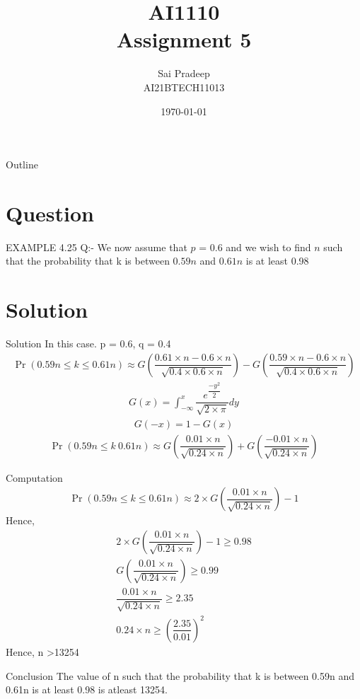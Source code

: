 \documentclass{beamer}
\title{AI1110 \\ Assignment 5}
\author{Sai Pradeep \\ AI21BTECH11013}
\date{\today}
\providecommand{\pr}[1]{\ensuremath{\Pr\left(#1\right)}}
\begin{document}
	\begin{frame}
		\titlepage
	\end{frame}
	\begin{frame}{Outline}
		\tableofcontents
	\end{frame}
	
	\section{Question}
	\begin{frame}{EXAMPLE 4.25}
Q:-	 We now assume that $p$ = 0.6 and we wish to find $n$ such that the probability that k
   is between $0.59n$ and $0.61n$ is at least 0.98\\
   \end{frame}
	
	\section{Solution}
	\begin{frame}{Solution}
In this case. p = 0.6, q = 0.4 \\
\begin{align}
\pr{0.59n \leq k \leq 0.61n} \approx G(\dfrac{0.61 \times n- 0.6 \times n}{\sqrt{0.4\times 0.6 \times n}})-G(\dfrac{0.59 \times n- 0.6 \times n}{\sqrt{0.4\times 0.6 \times n}})
\end{align}
\begin{align}
G(x) = \int_{-\infty}^x \dfrac{e^{\dfrac{-y^2}{2}}}{\sqrt{2 \times \pi }}dy
\end{align}
\begin{align}
G(-x)=1-G(x) 
\end{align}
\begin{align}
\pr{0.59n \leq k \ 0.61n} \approx G(\dfrac{0.01 \times n}{\sqrt{0.24 \times n}})+G(\dfrac{-0.01 \times n}{\sqrt{0.24 \times n}})
\end{align}
\end{frame}
\begin{frame}{Computation}
\begin{align}
\pr{0.59n \leq k \leq 0.61n} \approx 2 \times G(\dfrac{0.01 \times n}{\sqrt{0.24 \times n}})-1 
\end{align}
Hence,
\begin{align}
 2 \times G(\dfrac{0.01 \times n}{\sqrt{0.24 \times n}})-1 \geq 0.98  \\
G(\dfrac{0.01 \times n}{\sqrt{0.24 \times n}}) \geq 0.99  \\
 \dfrac{0.01 \times n}{\sqrt{0.24 \times n}} \geq 2.35\\
0.24 \times n \geq  (\dfrac{2.35}{0.01})^2
\end{align}
   Hence, n \textgreater 13254
\end{frame}
\begin{frame}{Conclusion}
The value of n such that the probability that k is between 0.59n and 0.61n is at least 0.98 is atleast 13254.
\end{frame}
\end{document}

